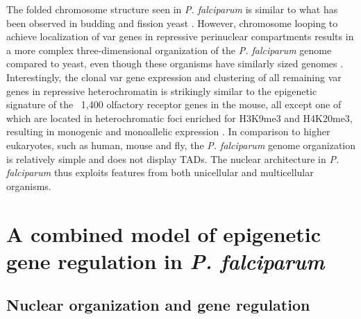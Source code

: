 The folded chromosome structure seen in \textit{P. falciparum} is similar to what has
been observed in budding and fission yeast \citep{duan:three-dimensional,
tanizawa:mapping}. However, chromosome
looping to achieve localization of var genes in repressive perinuclear
compartments results in a more complex three-dimensional organization of the
\textit{P. falciparum} genome compared to yeast, even though these organisms have
similarly sized genomes \citep{ay:three-dimensional}.
Interestingly, the clonal var gene expression
and clustering of all remaining var genes in repressive heterochromatin is
strikingly similar to the epigenetic signature of the ~1,400 olfactory
receptor genes in the mouse, all except one of which are located in
heterochromatic foci enriched for H3K9me3 and H4K20me3, resulting in monogenic
and monoallelic expression \citep{magklara:epigenetic, lyons:epigenetic}.
In comparison to higher eukaryotes, such
as human, mouse and fly, the \textit{P. falciparum} genome organization is relatively
simple and does not display TADs. The nuclear architecture in \textit{P.
falciparum}
thus exploits features from both unicellular and multicellular organisms.

\section{A combined model of epigenetic gene regulation in \textit{P.
falciparum}}

\subsection{Nuclear organization and gene regulation}

